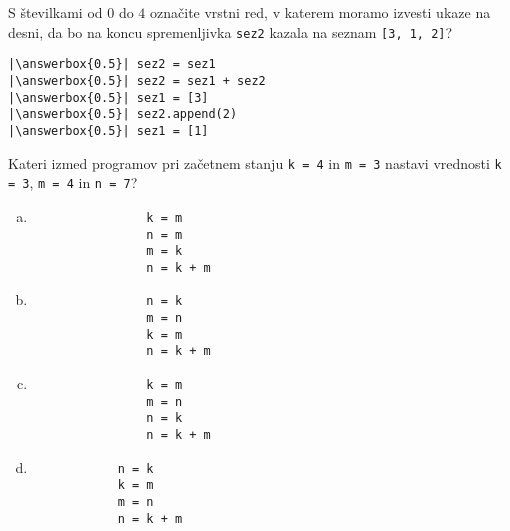 \documentclass[arhiv, 10pt]{../izpit}
\newcommand{\inlinepy}[1]{\texttt{#1}}
\newcommand{\answerbox}[1]{\framebox{\vphantom{\large M}\hspace{#1cm}}}
\begin{document}
        \naloga*
        \begin{multicols}{2}
        \noindent 
        S številkami od $0$ do $4$ označite vrstni red, v katerem moramo izvesti ukaze na desni, da bo na koncu spremenljivka \inlinepy{sez2} kazala na seznam \inlinepy{[3, 1, 2]}?
    
        \columnbreak
        \noindent
        \begin{verbatim}
|\answerbox{0.5}| sez2 = sez1
|\answerbox{0.5}| sez2 = sez1 + sez2
|\answerbox{0.5}| sez1 = [3]
|\answerbox{0.5}| sez2.append(2)
|\answerbox{0.5}| sez1 = [1]

        \end{verbatim}
        \end{multicols}
    
            
        \naloga*
        
        Kateri izmed programov pri začetnem stanju
            \inlinepy{k = 4} in
            \inlinepy{m = 3}
        nastavi vrednosti
            \inlinepy{k = 3},
            \inlinepy{m = 4} in
            \inlinepy{n = 7}?
    
        \begin{multicols}{4}
        \begin{enumerate}[(a)]
\item 
                \begin{verbatim}
                k = m
                n = m
                m = k
                n = k + m
                \end{verbatim}
            
\item 
                \begin{verbatim}
                n = k
                m = n
                k = m
                n = k + m
                \end{verbatim}
            
\item 
                \begin{verbatim}
                k = m
                m = n
                n = k
                n = k + m
                \end{verbatim}
            
\item 
            \begin{verbatim}
            n = k
            k = m
            m = n
            n = k + m
            \end{verbatim}
        
\end{enumerate}

        \end{multicols}
    
\end{document}
